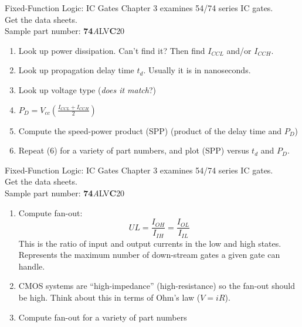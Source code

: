 \documentclass{beamer}
\begin{document}
\begin{frame}{Fixed-Function Logic: IC Gates}
\small
Chapter 3 examines 54/74 series IC gates. \\ \vspace{0.5cm}
 Get the data sheets. \\ \vspace{0.5cm}
Sample part number: \textbf{74}\textit{A}\alert{LV}\textbf{\alert{C}}20
\begin{enumerate}
\item Look up power dissipation.  Can't find it?  Then find $I_{CCL}$ and/or $I_{CCH}$.
\item Look up propagation delay time $t_d$.  Usually it is in nanoseconds.
\item Look up voltage type (\textit{does it match}?)
\item $P_D = V_{cc} \left(\frac{I_{CCL} + I_{CCH}}{2}\right)$
\item Compute the speed-power product (SPP) (product of the delay time and $P_D$)
\item Repeat (6) for a variety of part numbers, and plot (SPP) versus $t_d$ and $P_D$.
\end{enumerate}
\end{frame}

\begin{frame}{Fixed-Function Logic: IC Gates}
\small
Chapter 3 examines 54/74 series IC gates. \\ \vspace{0.5cm}
 Get the data sheets. \\ \vspace{0.5cm}
Sample part number: \textbf{74}\textit{A}\alert{LV}\textbf{\alert{C}}20
\begin{enumerate}
\item Compute fan-out:
\begin{equation}
UL = \frac{I_{OH}}{I_{IH}} = \frac{I_{OL}}{I_{IL}}
\end{equation}
This is the ratio of input and output currents in the low and high states.  Represents the maximum number of down-stream gates a given gate can handle.
\item CMOS systems are ``high-impedance'' (high-resistance) so the fan-out should be high.  Think about this in terms of Ohm's law ($V=iR$).
\item Compute fan-out for a variety of part numbers
\end{enumerate}
\end{frame}
\end{document}
